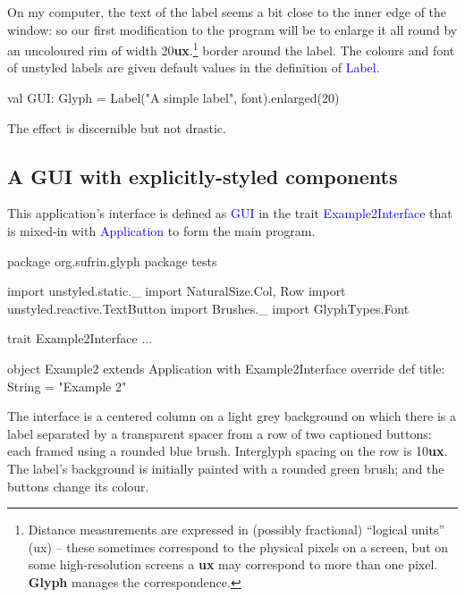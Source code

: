 \documentclass[12pt,a4paper]{article}
\def\ux{\textbf{ux}\xspace}
\def\Scala#1{\textcolor{blue}{\textsf{#1}}}
\def\SS#1{\subsection{#1}}
\begin{document}
On my computer, the text of the label seems a bit close to the
inner edge of the window: so our first modification to the
program will be to enlarge it all round by an uncoloured
rim of width 20\ux.\footnote{Distance measurements are
expressed in (possibly fractional) ``logical units'' (ux) -- these sometimes correspond
to the physical pixels on a screen, but on some high-resolution
screens a \textbf{ux} may correspond to more than one
pixel. \textbf{Glyph} manages the correspondence.} border around the label.
The colours and font of unstyled labels are given default values in
the definition of \Scala{Label}.

\begin{scala}

val GUI: Glyph = Label("A simple label", font).enlarged(20)
\end{scala}

\pagebreak[4]
The effect is discernible but not drastic.
\begin{center}
\quad
{}
\end{center}

\SS{A GUI with explicitly-styled components}

This application's interface is defined as \Scala{GUI} 
in the trait \Scala{Example2Interface} that is mixed-in with
\Scala{Application} to form the main program.

\begin{scala}
package org.sufrin.glyph
package tests

import unstyled.static._
import NaturalSize.{Col, Row}
import unstyled.reactive.TextButton
import Brushes._
import GlyphTypes.Font
\end{scala}

\begin{scala}
trait Example2Interface { ... }

object Example2 extends Application  with Example2Interface {
  override def title: String = "Example 2"
}
\end{scala}

\begin{center}
\end{center}

The interface is a centered column on a light grey background on
which there is a label separated by a transparent spacer
from a row of two captioned buttons: each framed using a
rounded blue brush. Interglyph spacing on the row is
10\ux.  The label's background is initially painted with
a rounded green brush; and the buttons
change its colour.
\end{document}
